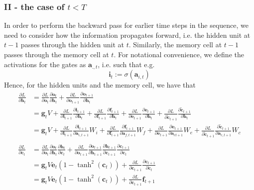 \documentclass{article}
\begin{document}
\subsubsection*{II - the case of $t < T$}
	In order to perform the backward pass for earlier time steps in the sequence, we need to consider how the information propagates forward, i.e. the hidden unit at $t-1$ passes through the hidden unit at $t$. Similarly, the memory cell at $t-1$ passes through the memory cell at $t$. For notational convenience, we define the activations for the gates as $\bm{a}_{., t}$, i.e. such that e.g.  
	$$\bm{i}_t := \sigma(\bm{a}_{i, t})$$ 
	Hence, for the hidden units and the memory cell, we have that
	\begin{align*}
		\frac{\partial L}{\partial \bm{h}_t} &= \frac{\partial L}{\partial \bm{o}_t} \frac{\partial\bm{o}_t}{\partial \bm{h}_t} + \frac{\partial L}{\partial \bm{o}_{t+1}} \frac{\partial\bm{o}_{t+1}}{\partial \bm{h}_t}\\
		&= \bm{g}_t V + \frac{\partial L}{\partial \bm{i}_{t+1}}\frac{\partial \bm{i}_{t+1}}{\partial \bm{h}_t} + \frac{\partial L}{\partial \bm{f}_{t+1}}\frac{\partial \bm{f}_{t+1}}{\partial \bm{h}_t}  + \frac{\partial L}{\partial \bm{e}_{t+1}}\frac{\partial \bm{e}_{t+1}}{\partial \bm{h}_t} + \frac{\partial L}{\partial \tilde{\bm{c}}_{t+1}}\frac{\partial \tilde{\bm{c}}_{t+1}}{\partial \bm{h}_t}\\
		&= \bm{g}_t V  + \frac{\partial L}{\partial \bm{i}_{t+1}} \frac{\partial \bm{i}_{t+1}}{\partial \bm{a}_{i, t+1}} W_i + \frac{\partial L}{\partial \bm{f}_{t+1}}  \frac{\partial \bm{f}_{t+1}}{\partial \bm{a}_{f, t+1}}W_f  + \frac{\partial L}{\partial \bm{e}_{t+1}}  \frac{\partial \bm{e}_{t+1}}{\partial \bm{a}_{e t+1}}W_e + \frac{\partial L}{\partial \tilde{\bm{c}}_{t+1}}  \frac{\partial \tilde{\bm{c}}_{t+1}}{\partial \bm{a}_{c, t+1}}W_c\\
	\\
	\frac{\partial L}{\partial \bm{c}_t} &= \frac{\partial L}{\partial \bm{o}_t} \frac{\partial\bm{o}_t}{\partial \bm{h}_t} \frac{\partial\bm{h}_t}{\partial \bm{c}_t} + \frac{\partial L}{\partial \bm{o}_{t+1}} \frac{\partial\bm{o}_{t+1}}{\partial \bm{h}_{t+1}} \frac{\partial\bm{h}_{t+1}}{\partial \bm{c}_{t+1}} \frac{\partial\bm{c}_{t+1}}{\partial \bm{c}_{t}}\\
	&= \bm{g}_t V \bm{e}_t(1 - \tanh^2(\bm{c}_t)) + \frac{\partial L}{\partial \bm{c}_{t+1}}\frac{\partial\bm{c}_{t+1}}{\partial \bm{c}_{t}} \\
	&= \bm{g}_t V \bm{e}_t(1 - \tanh^2(\bm{c}_t)) + \frac{\partial L}{\partial \bm{c}_{t+1}} \bm{f}_{t+1}
	\end{align*}
\end{document}
